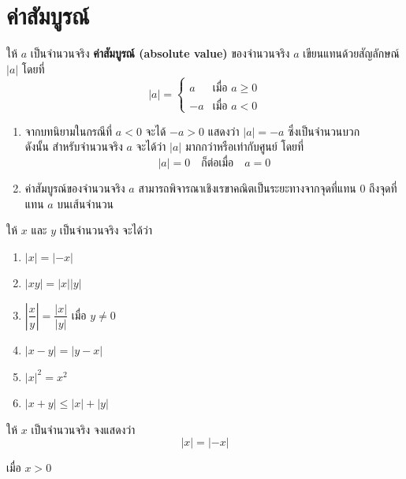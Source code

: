 \section{ค่าสัมบูรณ์}

\begin{definitionbox}\label{definition1.6}
	ให้ $a$ เป็นจำนวนจริง \textbf{ค่าสัมบูรณ์ (absolute value)} ของจำนวนจริง $a$ เขียนแทนด้วยสัญลักษณ์ $|a|$ โดยที่
	$$|a| = \begin{cases}
		a & \text{เมื่อ } a \geq 0 \\
		-a & \text{เมื่อ } a < 0
	\end{cases}$$
\end{definitionbox}

\vspace{1em}

\remark
\begin{enumerate}[label=\arabic*., leftmargin=2em, itemsep=0.8em]
	\item จากบทนิยามในกรณีที่ $a < 0$ จะได้ $-a > 0$ แสดงว่า $|a| = -a$ ซึ่งเป็นจำนวนบวก 
	\\
	ดังนั้น สำหรับจำนวนจริง $a$ จะได้ว่า $|a|$ มากกว่าหรือเท่ากับศูนย์ โดยที่
	$$|a| = 0 \quad \text{ก็ต่อเมื่อ} \quad a = 0$$
	
	\item ค่าสัมบูรณ์ของจำนวนจริง $a$ สามารถพิจารณาเชิงเรขาคณิตเป็นระยะทางจากจุดที่แทน $0$ ถึงจุดที่แทน $a$ บนเส้นจำนวน
\end{enumerate}

\begin{theorembox}
ให้ $x$ และ $y$ เป็นจำนวนจริง จะได้ว่า
\begin{enumerate}[label=\arabic*., leftmargin=*]
	\item $|x|=|-x|$
	\item $|x y|=|x||y|$
	\item $\left|\dfrac{x}{y}\right|=\dfrac{|x|}{|y|}$ เมื่อ $y \neq 0$
	\item $|x-y|=|y-x|$
	\item $|x|^2=x^2$
	\item $|x+y| \leq|x|+|y|$
\end{enumerate}
\end{theorembox}

\newpage
\begin{examplebox}
	ให้ $x$ เป็นจำนวนจริง จงแสดงว่า 
	\[
	|x| = |-x|
	\]
\end{examplebox}

\proof

\case เมื่อ $x > 0$

